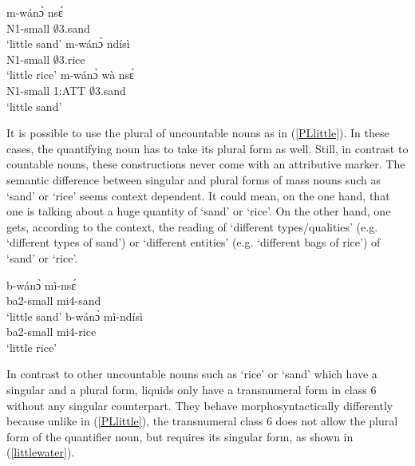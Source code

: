 \begin{exe}
\ex\label{little}
\begin{xlist}
\ex \label{little1}
  \gll     m-wánɔ̀ nsɛ́ \\
                N1-small $\emptyset$3.sand\\
    \trans `little sand'
\ex\label{little2}
 \gll     m-wánɔ̀ ndísì  \\
             N1-small $\emptyset$3.rice  \\
    \trans `little rice'
\ex \label{little3}
  \gll     *m-wánɔ̀ wà nsɛ́ \\
                N1-small 1:ATT $\emptyset$3.sand\\
    \trans `little sand'
\end {xlist}
\end {exe}

It is possible to use the plural of uncountable nouns as in (\ref{PLlittle}). In these cases, the quantifying noun has to take its plural form as well. Still, in contrast to countable nouns, these constructions never come with an attributive marker. The semantic difference between singular and plural forms of mass nouns such as `sand' or `rice' seems context dependent. It could mean, on the one hand, that one is talking about a huge quantity of `sand' or `rice'. On the other hand, one gets, according to the context, the reading of `different types/qualities' (e.g. `different types of sand') or `different entities' (e.g. `different bags of rice') of `sand' or `rice'.

\begin{exe}
\ex\label{PLlittle}
\begin{xlist}
\ex \label{PLlittle1}
  \gll     b-wánɔ̀ mì-nsɛ́ \\
                ba2-small mi4-sand\\
    \trans `little sand'
\ex\label{PLlittle2}
 \gll     b-wánɔ̀ mì-ndísì  \\
             ba2-small mi4-rice  \\
    \trans `little rice'
\end {xlist}
\end {exe}

In contrast to other uncountable nouns such as `rice' or `sand' which have a singular and a plural form, liquids only have a transnumeral form in class 6 without any singular counterpart. They behave morphosyntactically differently because unlike in (\ref{PLlittle}), the transnumeral class 6 does not allow the plural form of the quantifier noun, but requires its singular form, as shown in (\ref{littlewater}).

